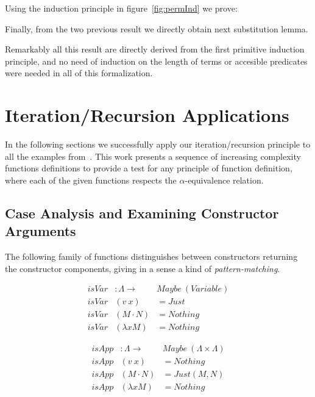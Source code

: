 \documentclass{article}
\newcommand{\alp}{\ensuremath{\alpha}}
\begin{document}
Using the induction principle in figure~\ref{fig:permInd} we prove:

 \hspace{5px}

Finally, from the two previous result we directly obtain next substitution lemma.

 \hspace{5px}

Remarkably all this result are directly derived from the first primitive induction principle, and no need of induction on the length of terms or accesible predicates were needed in all of this formalization.

\appendix

\section{Iteration/Recursion Applications}
\label{sec:applications}

In the following sections we successfully apply our iteration/recursion principle to all the examples from~\cite{Norrish04recursivefunction}. This work presents a sequence of increasing complexity functions definitions to provide a test for any principle of function definition, where each of the given functions respects the \alp-equivalence relation.

\subsection{Case Analysis and Examining Constructor Arguments}
\label{sec:caseanalysis}

The following family of functions distinguishes between constructors returning the constructor components, giving in a sense a kind of \emph{pattern-matching}.

\begin{minipage}{.5\textwidth}
\[\begin{array}{rll}
isVar &: \Lambda \rightarrow& Maybe\ ( Variable ) \\
isVar &(v\ x)         &= Just \\
isVar &(M \cdot N)   &= Nothing \\
isVar &(\lambda x M) &= Nothing
\end{array}\]
\end{minipage}
\begin{minipage}{.5\textwidth}
\[\begin{array}{rll}
isApp &: \Lambda \rightarrow& Maybe\ (\Lambda \times \Lambda) \\
isApp &(v\ x)          &= Nothing \\
isApp &(M \cdot N)   &= Just (M , N) \\
isApp &(\lambda x M) &= Nothing
\end{array}\]
\end{minipage}
\end{document}
